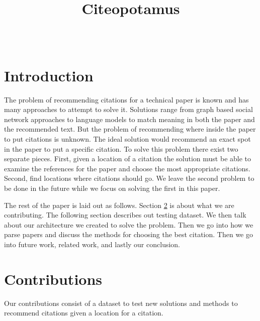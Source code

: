 \documentclass[10pt, conference, compsocconf]{IEEEtran}
\begin{document}
\title{Citeopotamus}


\author{
\\
}

\maketitle

\thispagestyle{empty}
\pagestyle{empty}

\section{Introduction}\label{sec:introduction}
The problem of recommending citations for a technical paper is known and has many approaches to attempt to solve it.\cite{cite1,cite2,cite3,cite4,cite5,cite6,cite7,cite8} Solutions range from graph based social network approaches to language models to match meaning in both the paper and the recommended text. But the problem of recommending where inside the paper to put citations is unknown. 
The ideal solution would recommend an exact spot in the paper to put a specific citation. To solve this problem there exist two separate pieces. First, given a location of a citation the solution must be able to examine the references for the paper and choose the most appropriate citations.
Second, find locations where citations should go. We leave the second problem to be done in the future while we focus on solving the first in this paper.

The rest of the paper is laid out as follows. Section \ref{sec:contributions} is about what we are contributing. The following section describes
out testing dataset. We then talk about our architecture we created to solve the problem. Then we go into how we parse papers and
discuss the methods for choosing the best citation. Then we go into future work, related work, and lastly our conclusion.

\section{Contributions}\label{sec:contributions}
Our contributions consist of a dataset to test new solutions and methods to recommend citations given a location for a citation.
\end{document}
